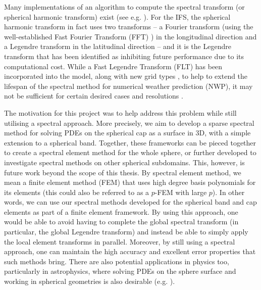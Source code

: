 Many implementations of an algorithm to compute the spectral transform (or spherical harmonic transform) exist (see e.g. \cite{slevinsky2019fast, suda2002fast}). For the IFS, the spherical harmonic transform in fact uses two transforms -- a Fourier transform (using the well-established Fast Fourier Transform (FFT) \cite{cooley1965algorithm}) in the longitudinal direction and a Legendre transform in the latitudinal direction -- and it is the Legendre transform that has been identified as inhibiting future performance due to its computational cost. While a Fast Legendre Transform (FLT) \cite{wedi2013fast} has been incorporated into the model, along with new grid types \cite{malardel2016new}, to help to extend the lifespan of the spectral method for numerical weather prediction (NWP), it may not be sufficient for certain desired cases and resolutions \cite{wedi2014increasing}. 

The motivation for this project was to help address this problem while still utilising a spectral approach. More precisely, we aim to develop a sparse spectral method for solving PDEs on the spherical cap as a surface in 3D, with a simple extension to a spherical band. Together, these frameworks can be pieced together to create a spectral element method for the whole sphere, or further developed to investigate spectral methods on other spherical subdomains. This, however, is future work beyond the scope of this thesis. By spectral element method, we mean a finite element method (FEM) that uses high degree basis polynomials for its elements (this could also be referred to as a $p$-FEM with large $p$). In other words, we can use our spectral methods developed for the spherical band and cap elements as part of a finite element framework. By using this approach, one would be able to avoid having to complete the global spectral transform (in particular, the global Legendre transform) and instead be able to simply apply the local element transforms in parallel. Moreover, by still using a spectral approach, one can maintain the high accuracy and excellent error properties that such methods bring. There are also potential applications in physics too, particularly in astrophysics, where solving PDEs on the sphere surface and working in spherical geometries is also desirable (e.g. \cite{vasil2019tensor, reinecke2013libsharp, beyer2014numerical, varshalovich1988quantum, slevinsky2018spectral, rubinstein2015scalar}).

